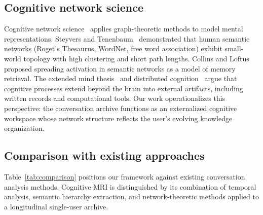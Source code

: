 \documentclass[journal]{IEEEtran}
\begin{document}
\subsection{Cognitive network science}

Cognitive network science~\cite{siew2019cognitive} applies graph-theoretic
methods to model mental representations.  Steyvers and
Tenenbaum~\cite{steyvers2005large} demonstrated that human semantic
networks (Roget's Thesaurus, WordNet, free word association) exhibit
small-world topology with high clustering and short path lengths.
Collins and Loftus~\cite{collins1975spreading} proposed spreading
activation in semantic networks as a model of memory retrieval.
The extended mind thesis~\cite{clark1998extended} and distributed
cognition~\cite{hutchins1995cognition} argue that cognitive processes
extend beyond the brain into external artifacts, including written
records and computational tools.  Our work operationalizes this
perspective: the conversation archive functions as an externalized
cognitive workspace whose network structure reflects the user's
evolving knowledge organization.

\subsection{Comparison with existing approaches}

Table~\ref{tab:comparison} positions our framework against existing
conversation analysis methods.  Cognitive MRI is distinguished by its
combination of temporal analysis, semantic hierarchy extraction, and
network-theoretic methods applied to a longitudinal single-user archive.
\end{document}

